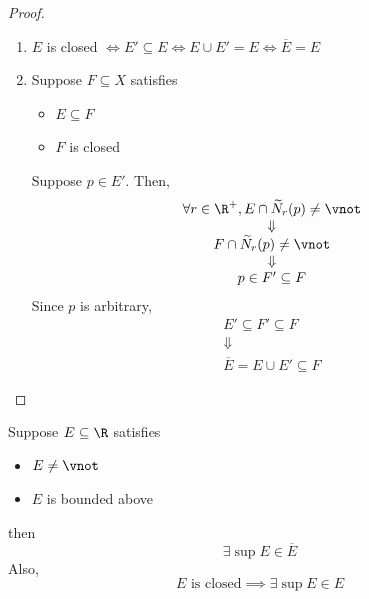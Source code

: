 \begin{proof}
\begin{enumerate}[label=\textbf{(\Alph*)}]
\[\begin{array}{c}
              \Downarrow                                                                \\
              N_{r}(p) \subseteq \paren*{\overline{E}}^{c} = E^{c} \cap \paren*{E'}^{c} \\
              \Downarrow                                                                \\
              p \in \paren*{\paren*{\overline{E}}^{c}}^{\circ}
            \end{array}
          \]
          Since $p$ is arbitrary,
          \[
            \paren*{\overline{E}}^{c} \text{ is open}
          \]
          By \cref{an:cor:closed-set-complement-is-open-set},
          \[
            \overline{E} \text{ is closed}
          \]
    \item $E$ is closed $\iff E' \subseteq E \iff E \cup E' = E \iff \overline{E} = E$
    \item Suppose $F \subseteq X$ satisfies
          \begin{itemize}
            \item $E \subseteq F$
            \item $F$ is closed
          \end{itemize}
          Suppose $p \in E'$. Then,
          \[
            \begin{array}{c}
              \forall r \in \R^{+}, E \cap \widetilde{N}_{r}(p) \neq \vnot \\
              \Downarrow                                                   \\
              F \cap \widetilde{N}_{r}(p) \neq \vnot                       \\
              \Downarrow                                                   \\
              p \in F' \subseteq F
            \end{array}
          \]
          Since $p$ is arbitrary,
          \[
            \begin{array}{c}
              E' \subseteq F' \subseteq F \\
              \Downarrow                  \\
              \overline{E} = E \cup E' \subseteq F
            \end{array}
          \]
  \end{enumerate}
\end{proof}

\bigskip

\begin{theorem} \label{an:thm:supremum-in-closure}
  Suppose $E \subseteq \R$ satisfies
  \begin{itemize}
    \item $E \neq \vnot$
    \item $E$ is bounded above
  \end{itemize}
  then
  \[
    \exists \sup E \in \overline{E}
  \]
  Also,
  \[
    E \text{ is closed} \implies \exists \sup E \in E
  \]
\end{theorem}


